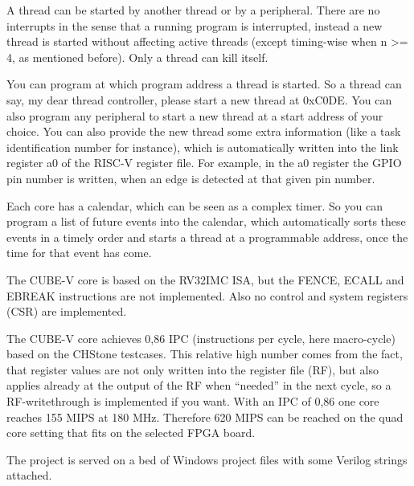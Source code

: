 A thread can be started by another thread or by a peripheral. There are no interrupts in the sense that a running program is interrupted, instead a new thread is started without affecting active threads (except timing-wise when n \textgreater= 4, as mentioned before). Only a thread can kill itself.

You can program at which program address a thread is started. So a thread can say, my dear thread controller, please start a new thread at 0xC0DE. You can also program any peripheral to start a new thread at a start address of your choice. You can also provide the new thread some extra information (like a task identification number for instance), which is automatically written into the link register a0 of the RISC-V register file. For example, in the a0 register the GPIO pin number is written, when an edge is detected at that given pin number.

Each core has a calendar, which can be seen as a complex timer. So you can program a list of future events into the calendar, which automatically sorts these events in a timely order and starts a thread at a programmable address, once the time for that event has come.

The CUBE-V core is based on the RV32IMC ISA, but the FENCE, ECALL and EBREAK instructions are not implemented. Also no control and system registers (CSR) are implemented.

The CUBE-V core achieves 0,86 IPC (instructions per cycle, here macro-cycle) based on the CHStone testcases. This relative high number comes from the fact, that register values are not only written into the register file (RF), but also applies already at the output of the RF when “needed” in the next cycle, so a RF-writethrough is implemented if you want. With an IPC of 0,86 one core reaches 155 MIPS at 180 MHz. Therefore 620 MIPS can be reached on the quad core setting that fits on the selected FPGA board.

The project is served on a bed of Windows project files with some Verilog strings attached.
